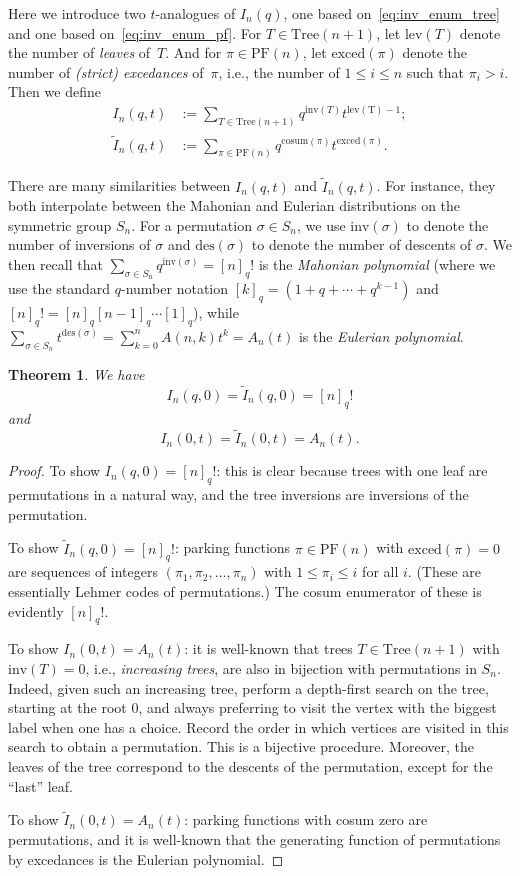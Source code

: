 \documentclass[11pt]{amsart}
\newtheorem{thm}{Theorem}
\begin{document}
Here we introduce two $t$-analogues of $I_n(q)$, one based on~\eqref{eq:inv_enum_tree} and one based on~\eqref{eq:inv_enum_pf}. For $T\in\mathrm{Tree}(n+1)$, let $\mathrm{lev}(T)$ denote the number of \emph{leaves} of~$T$. And for $\pi \in \mathrm{PF}(n)$, let $\mathrm{exced}(\pi)$ denote the number of \emph{(strict) excedances} of~$\pi$, i.e., the number of $1\leq i \leq n$ such that $\pi_i > i$. Then we define
\begin{align*}
I_n(q,t) &:= \sum_{T\in \mathrm{Tree}(n+1)}q^{\mathrm{inv}(T)}t^{\mathrm{lev(T)-1}};\\
\widetilde{I}_n(q,t) &:= \sum_{\pi\in \mathrm{PF}(n)} q^{\mathrm{cosum}(\pi)}t^{\mathrm{exced}(\pi)}.
\end{align*}

There are many similarities between $I_n(q,t)$ and $\widetilde{I}_n(q,t)$. For instance, they both interpolate between the Mahonian and Eulerian distributions on the symmetric group $S_n$. For a permutation $\sigma \in S_n$, we use $\mathrm{inv}(\sigma)$ to denote the number of inversions of $\sigma$ and $\mathrm{des}(\sigma)$ to denote the number of descents of $\sigma$. We then recall that $\sum_{\sigma \in S_n}q^{\mathrm{inv}(\sigma)} = [n]_q!$ is the \emph{Mahonian polynomial} (where we use the standard $q$-number notation $[k]_q=(1+q+\cdots+q^{k-1})$ and $[n]_q!=[n]_q[n-1]_q\cdots[1]_q$), while $\sum_{\sigma \in S_n}t^{\mathrm{des}(\sigma)} = \sum_{k=0}^{n}A(n,k)t^k=A_n(t)$ is the \emph{Eulerian polynomial}.

\begin{thm}
We have
\[I_n(q,0)=\widetilde{I}_n(q,0)= [n]_q!\]
and
\[I_n(0,t)=\widetilde{I}_n(0,t) = A_n(t).\]
\end{thm}
\begin{proof}
To show $I_n(q,0)=[n]_q!$: this is clear because trees with one leaf are permutations in a natural way, and the tree inversions are inversions of the permutation.

To show $\widetilde{I}_n(q,0) = [n]_q!$: parking functions $\pi\in \mathrm{PF}(n)$ with $\mathrm{exced}(\pi)=0$ are sequences of integers $(\pi_1,\pi_2,\ldots,\pi_n)$ with $1 \leq \pi_i \leq i$ for all $i$. (These are essentially Lehmer codes of permutations.) The cosum enumerator of these is evidently $[n]_q!$.

To show $I_n(0,t)=A_n(t)$: it is well-known that trees $T \in \mathrm{Tree}(n+1)$ with $\mathrm{inv}(T)=0$, i.e., \emph{increasing trees}, are also in bijection with permutations in $S_n$. Indeed, given such an increasing tree, perform a depth-first search on the tree, starting at the root $0$, and always preferring to visit the vertex with the biggest label when one has a choice. Record the order in which vertices are visited in this search to obtain a permutation. This is a bijective procedure. Moreover, the leaves of the tree correspond to the descents of the permutation, except for the ``last'' leaf.

To show $\widetilde{I}_n(0,t)=A_n(t)$: parking functions with cosum zero are permutations, and it is well-known that the generating function of permutations by excedances is the Eulerian polynomial.
\end{proof}
\end{document}
